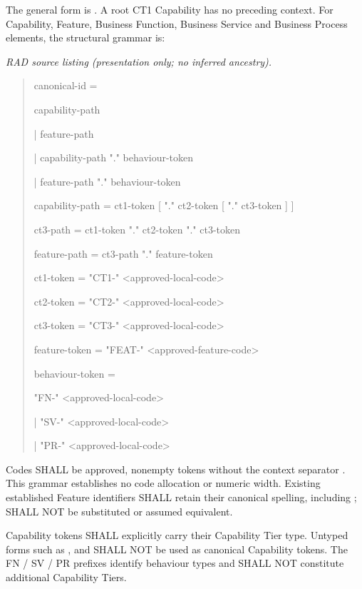The general form is \texttt{}. A root CT1 Capability has no preceding context. For Capability, Feature, Business Function, Business Service and Business Process elements, the structural grammar is:

\label{rad:metamodel:341}

\textit{RAD source listing (presentation only; no inferred ancestry).}
\begin{quote}
canonical-id =

capability-path

| feature-path

| capability-path "." behaviour-token

| feature-path "." behaviour-token

capability-path = ct1-token [ "." ct2-token [ "." ct3-token ] ]

ct3-path = ct1-token "." ct2-token "." ct3-token

feature-path = ct3-path "." feature-token

ct1-token = "CT1-" <approved-local-code>

ct2-token = "CT2-" <approved-local-code>

ct3-token = "CT3-" <approved-local-code>

feature-token = "FEAT-" <approved-feature-code>

behaviour-token =

"FN-" <approved-local-code>

| "SV-" <approved-local-code>

| "PR-" <approved-local-code>
\end{quote}
\label{rad:metamodel:362}

Codes SHALL be approved, nonempty tokens without the context separator \texttt{}. This grammar establishes no code allocation or numeric width. Existing established Feature identifiers SHALL retain their canonical spelling, including \texttt{}; \texttt{} SHALL NOT be substituted or assumed equivalent.

\label{rad:metamodel:364}

Capability tokens SHALL explicitly carry their Capability Tier type. Untyped forms such as \texttt{}, \texttt{} and \texttt{} SHALL NOT be used as canonical Capability tokens. The FN /\allowbreak{} SV /\allowbreak{} PR prefixes identify behaviour types and SHALL NOT constitute additional Capability Tiers.

